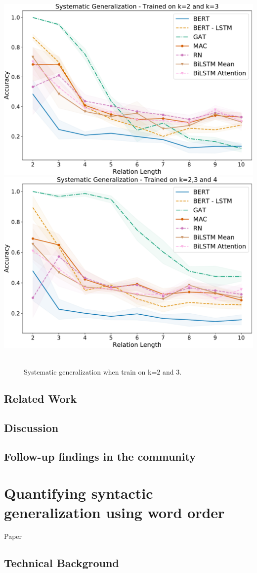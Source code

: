 \documentclass[letterpaper, 12pt]{report}
\begin{document}
\begin{center}
\includegraphics[height=0.3\textwidth]{figs/clutrr/emnlp/sys_gen_23.pdf}
\includegraphics[height=0.3\textwidth]{figs/clutrr/emnlp/sys_gen_234.pdf}
\end{center}
\begin{figure}[htbp]
\centering
\includegraphics[height=0.0001in]{figs/empy_fig.png}
\caption{Systematic generalization when train on k=\(2\) and \(3\).}
\end{figure}


\section{Related Work}
\label{sec:org90fb063}
\section{Discussion}
\label{sec:orgaf96b9b}
\section{Follow-up findings in the community}
\label{sec:org53c3914}
\clearpage
\chapter{Quantifying syntactic generalization using word order}
\label{sec:orgc518e9d}

Paper \cite{sinha2021a}

\section{Technical Background}
\label{sec:org79bc56d}
\end{document}
